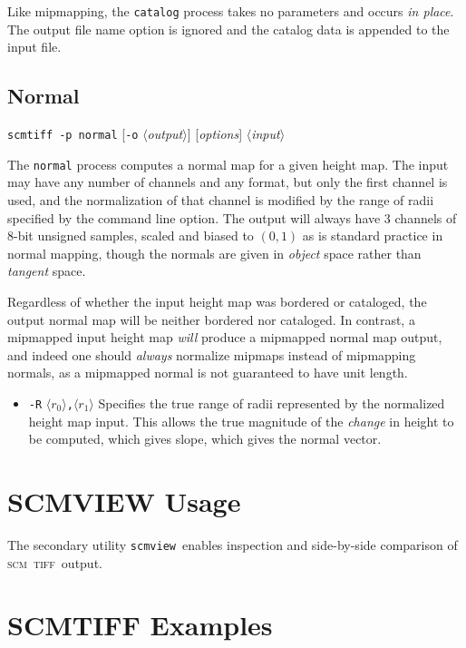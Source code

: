 \documentclass[oneside,10pt]{memoir}
\newcommand{\scm}     {\textsc{scm}}
\newcommand{\tiff}    {\textsc{tiff}}
\newcommand{\scmtiff} {\texttt{scmtiff}}
\newcommand{\scmview} {\texttt{scmview}}
\newcommand{\inangles}[1]{$\langle$#1$\rangle$}
\newenvironment{optionlist}
  {\setlength{\leftmargini}{1in}\begin{itemize}}{\end{itemize}}
\begin{document}
\begin{Spacing}{1.1}
Like mipmapping, the \texttt{catalog} process takes no parameters and occurs \emph{in place}. The output file name option is ignored and the catalog data is appended to the input file.

\subsection{Normal}

\noindent\scmtiff\ \texttt{-p normal} [\texttt{-o} \inangles{\textit{output}}] [\textit{options}] \inangles{\textit{input}}

\bigskip The \texttt{normal} process computes a normal map for a given height map. The input may have any number of channels and any format, but only the first channel is used, and the normalization of that channel is modified by the range of radii specified by the command line option. The output will always have 3 channels of 8-bit unsigned samples, scaled and biased to $(0,1)$ as is standard practice in normal mapping, though the normals are given in \emph{object} space rather than \emph{tangent} space.

Regardless of whether the input height map was bordered or cataloged, the output normal map will be neither bordered nor cataloged. In contrast, a mipmapped input height map \emph{will} produce a mipmapped normal map output, and indeed one should \emph{always} normalize mipmaps instead of mipmapping normals, as a mipmapped normal is not guaranteed to have unit length.

\begin{optionlist}
\item[\texttt{-R} \inangles{$r_0$}\texttt{,}\inangles{$r_1$}] Specifies the true range of radii represented by the normalized height map input. This allows the true magnitude of the \emph{change} in height to be computed, which gives slope, which gives the normal vector.
\end{optionlist}

\section{SCMVIEW Usage}

The secondary utility \scmview\ enables inspection and side-by-side comparison of \scm\ \tiff\ output.

\section{SCMTIFF Examples}


\end{Spacing}
\end{document}
